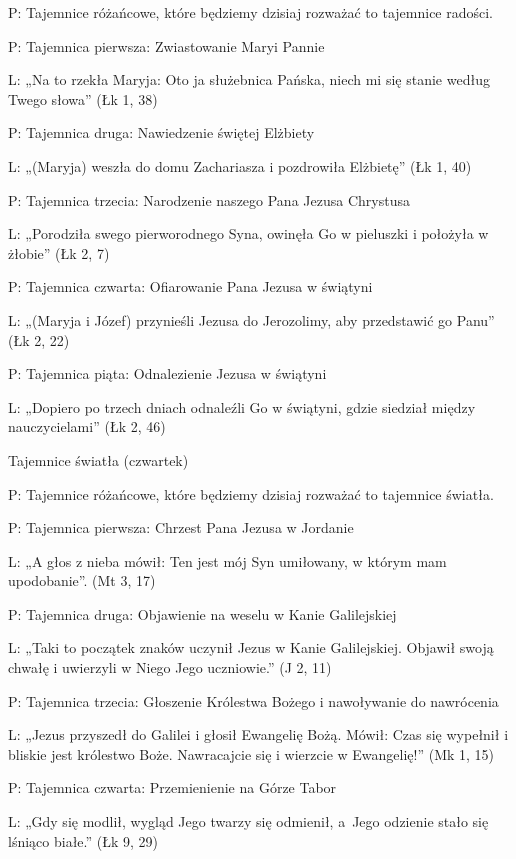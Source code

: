 ﻿\documentclass[9pt,twoside]{extarticle}
\begin{document}
{\hnr P:} Tajemnice różańcowe, które będziemy dzisiaj rozważać to tajemnice radości.


{\hnr P:} Tajemnica pierwsza: Zwiastowanie Maryi Pannie


{\hnr L:} „Na to rzekła Maryja: Oto ja służebnica Pańska, niech mi się stanie według Twego słowa” (Łk 1, 38)


{\hnr P:} Tajemnica druga: Nawiedzenie świętej Elżbiety


{\hnr L:} „(Maryja) weszła do domu Zachariasza i pozdrowiła Elżbietę” (Łk 1, 40)


{\hnr P:} Tajemnica trzecia: Narodzenie naszego Pana Jezusa Chrystusa


{\hnr L:} „Porodziła swego pierworodnego Syna, owinęła Go w pieluszki i położyła w żłobie” (Łk 2, 7)


{\hnr P:} Tajemnica czwarta: Ofiarowanie Pana Jezusa w świątyni


{\hnr L:} „(Maryja i Józef) przynieśli Jezusa do Jerozolimy, aby przedstawić go Panu” (Łk 2, 22)


{\hnr P:} Tajemnica piąta: Odnalezienie Jezusa w świątyni


{\hnr L:} „Dopiero po trzech dniach odnaleźli Go w świątyni, gdzie siedział między nauczycielami” (Łk 2, 46)


{\hnr Tajemnice światła (czwartek)}


{\hnr P:} Tajemnice różańcowe, które będziemy dzisiaj rozważać to tajemnice światła.


{\hnr P:} Tajemnica pierwsza: Chrzest Pana Jezusa w Jordanie


{\hnr L:} „A głos z nieba mówił: Ten jest mój Syn umiłowany, w którym mam upodobanie”. (Mt 3, 17)


{\hnr P:} Tajemnica druga: Objawienie na weselu w Kanie Galilejskiej


{\hnr L:} „Taki to początek znaków uczynił Jezus w Kanie Galilejskiej. Objawił swoją chwałę i uwierzyli w Niego Jego uczniowie.” (J 2, 11)


{\hnr P:} Tajemnica trzecia: Głoszenie Królestwa Bożego i nawoływanie do nawrócenia


{\hnr L:} „Jezus przyszedł do Galilei i głosił Ewangelię Bożą. Mówił: Czas się wypełnił i bliskie jest królestwo Boże. Nawracajcie się i wierzcie w Ewangelię!” (Mk 1, 15)


{\hnr P:} Tajemnica czwarta: Przemienienie na Górze Tabor


{\hnr L:} „Gdy się modlił, wygląd Jego twarzy się odmienił, a~Jego odzienie stało się lśniąco białe.” (Łk 9, 29)
\end{document}
